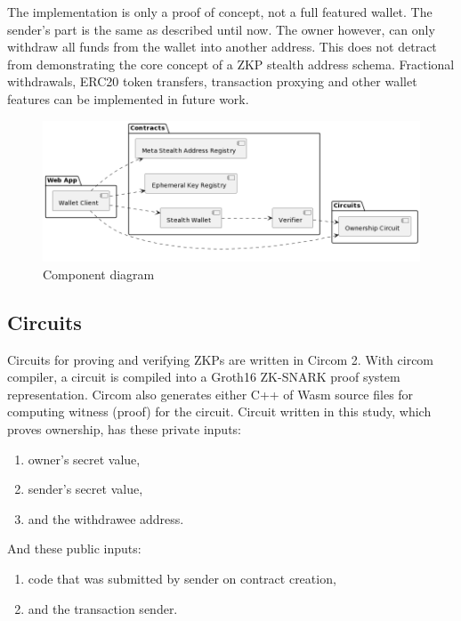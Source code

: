 \documentclass[conference,comsoc,10pt]{IEEEtran}
\begin{document}
    The implementation is only a proof of concept, not a full featured wallet.
    The sender's part is the same as described until now. The owner however,
    can only withdraw all funds from the wallet into another address. This does
    not detract from demonstrating the core concept of a ZKP stealth address schema.
    Fractional withdrawals, ERC20 token transfers, transaction proxying and other wallet
    features can be implemented in future work.

    \begin{figure}[h!]
        \centering
        \includegraphics[scale=0.3]{../bachelor/assets/images/component-diagram.png}
        \caption{Component diagram}
        \label{fig:component-diagram}
        \vspace{0.5cm}
    \end{figure}

    \subsection{Circuits}

        Circuits for proving and verifying ZKPs are written in Circom 2\cite{circom}.
        With circom compiler, a circuit is compiled into a Groth16
        ZK-SNARK proof system\cite{Groth16} representation. Circom also generates
        either C++ of Wasm source files for computing witness (proof) for the
        circuit. Circuit written in this study, which proves ownership, has
        these private inputs:
        \begin{enumerate}
            \item owner's secret value,
            \item sender's secret value,
            \item and the withdrawee address.
        \end{enumerate}
        And these public inputs:
        \begin{enumerate}
            \item code that was submitted by sender on contract creation,
            \item and the transaction sender.
        \end{enumerate}
\end{document}
